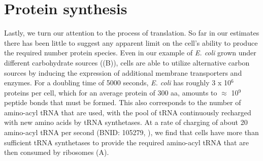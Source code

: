 \section{Protein synthesis}

Lastly, we turn our attention to the process of translation. So far in our
estimates there has been little to suggest any apparent limit on the cell's
ability to produce the required number protein species. Even in our example of
\textit{E. coli} grown under different carbohydrate sources
((B)), cells are able to utilize alternative carbon sources by
inducing the expression of additional membrane transporters and enzymes. For a
doubling time of 5000 seconds, \textit{E. coli} has roughly 3 x 10$^6$ proteins
per cell, which for an average protein of 300 aa, amounts to $\approx$ 10$^9$
peptide bonds that must be formed. This also corresponds to the number of
amino-acyl tRNA that are used, with the pool of tRNA continuously recharged with
new amino acids by tRNA synthetases. At a rate of charging of about 20
amino-acyl tRNA per second (BNID: 105279, \cite{milo2010}), we find that cells
have more than sufficient tRNA synthetases to provide the required amino-acyl
tRNA that are then consumed by ribosomes (A).

\begin{figure}
    \begin{fullwidth}
    \end{fullwidth}
\end{figure}


